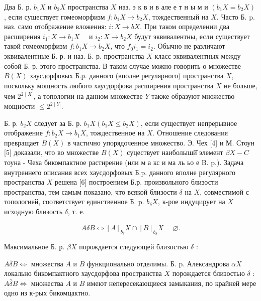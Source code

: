 \documentclass[10pt]{article}
\begin{document}
Два Б. р. $b_{1} X$ и $b_{2} X$ пространства $X$ наз. э к в и в але е т н ы м и $\left(b_{1} X=b_{2} X\right)$, если существует гомеоморфизм $f: b_{1} X \rightarrow b_{2} X$, тождественный на $X$. Часто Б. p. наз. само отображение вложения: $i: X \rightarrow b X$. При таком определении два расширения $i_{1}: X \rightarrow b_{1} X \quad$ и $i_{2}: X \rightarrow b_{2} X$ будут эквивалентны, если существует такой гомеоморфизм $f: b_{1} X \rightarrow b_{2} X$, что $f_{0} i_{1}=i_{2}$. Обычно не различают эквивалентные Б. р. и наз. Б. р. пространства $X$ класс эквивалентных между собой Б. р. этого пространства. В таком случае можно говорить о множестве $B(X)$ хаусдорфовых Б.р. данного (вполне регулярного) пространства $X$, поскольку мощность любого хаусдорфова расширения пространства $X$ не больше, чем $2^{2 \mid X^{\prime}}$, а топологии на данном множестве $Y$ также образуют множество мощности $\leqslant 2^{2 \mid Y_{\mid}}$.



Б. р. $b_{2} X$ следует за Б. р. $b_{1} X\left(b_{1} X \leqslant b_{2} X\right)$, если существует непрерывное отображение $f: b_{2} X \rightarrow b_{1} X$, тождественное на $X$. Отношение следования превращает $B(X)$ в частично упорядоченное множество. Э. Чех [4] и М. Стоун [5] доказали, что во множестве $B(X)$ суцествует наиболышй̆ элемент $\beta X-C$ тоуна - Чеха бикомпактное растирение (или м а кс и ма ль ьо е B. p.). Задача внутреннего описания всех хаусдорфовых Б.p. данного вполне регулярного пространства $X$ решена [6] построением Б.р. произвольного близости пространства, тем самым показано, что всякой близости $\delta$ на $X$, совместимой с топологией, соответствует единственное Б. p. $b_{\delta} X$, к-рое индуцирует на $X$ исходную близость $\delta$, т. е.



\[

A \bar{\delta} B \Longleftrightarrow[A]_{b_{\delta}} X \cap[B]_{b_{\delta}} X=\varnothing .

\]



Максимальное Б. р. $\beta X$ порождается следующей близостью $\delta$ :



$A \bar{\delta} B \Longleftrightarrow$ множества $A$ и $B$ функционально отделимы. Б. p. Александрова $\alpha X$ локально бикомпактного хаусдорфова пространства $X$ порождается близостью $\delta$ : $A \bar{\delta} B \Longleftrightarrow$ множества $A$ и $B$ имеют непересекающиеся замыкания, по крайней мере одно из к-рых бикомцактно.
\end{document}
